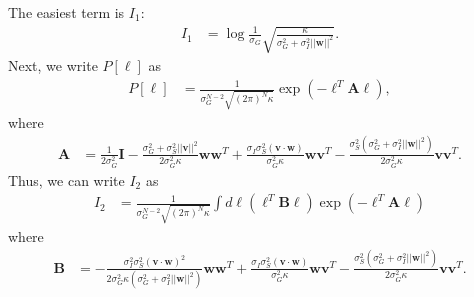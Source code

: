 \documentclass[11pt]{article}
\begin{document}
The easiest term is $I_1$:
\begin{align}
	I_1 &= \log \frac{1}{\sigma_G} \sqrt{\frac{\kappa}{\sigma_G^2 + \sigma_I^2 ||\mathbf{w}||^2}}.
\end{align}
Next, we write $P[\boldsymbol{\ell}]$ as 
\begin{align}
	P[\boldsymbol{\ell}] &= \frac{1}{\sigma_G^{N-2}\sqrt{(2\pi)^N \kappa}} \exp\left(- \boldsymbol{\ell}^T \mathbf{A} \boldsymbol{\ell}\right), 
\end{align}
where 
\begin{align}
	\mathbf{A} &= \frac{1}{2\sigma_G^2}\mathbf{I} - \frac{\sigma_G^2 +\sigma_S^2 ||\mathbf{v}||^2}{2\sigma_G^2 \kappa} \mathbf{ww}^T+ \frac{\sigma_I \sigma_S^2 (\mathbf{v}\cdot \mathbf{w})}{\sigma_G^2 \kappa} \mathbf{wv}^T - \frac{\sigma_S^2 (\sigma_G^2 + \sigma_I^2 ||\mathbf{w}||^2)}{2\sigma_G^2 \kappa} \mathbf{vv}^T.
\end{align}
Thus, we can write $I_2$ as 
\begin{align}
	I_2 &= \frac{1}{\sigma_G^{N-2}\sqrt{(2\pi)^N \kappa}}\int d\boldsymbol{\ell} (\boldsymbol{\ell}^T \mathbf{B} \boldsymbol{\ell}) \exp(-\boldsymbol{\ell}^T \mathbf{A} \boldsymbol{\ell})
\end{align}
where 
\begin{align}
	\mathbf{B} &= - \frac{\sigma_I^2 \sigma_S^2 (\mathbf{v}\cdot \mathbf{w})^2}{2 \sigma_G^2 \kappa(\sigma_G^2 + \sigma_I^2 ||\mathbf{w}||^2)} \mathbf{ww}^T+ \frac{\sigma_I \sigma_S^2 (\mathbf{v}\cdot \mathbf{w})}{\sigma_G^2 \kappa} \mathbf{wv}^T - \frac{\sigma_S^2(\sigma_G^2 + \sigma_I^2 ||\mathbf{w}||^2)}{2 \sigma_G^2 \kappa} \mathbf{vv}^T.
\end{align}
\end{document}
